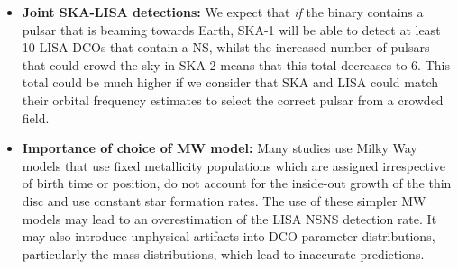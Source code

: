\begin{itemize}
    \item \textbf{Joint SKA-LISA detections:} We expect that \textit{if} the binary contains a pulsar that is beaming towards Earth, SKA-1 will be able to detect at least 10 LISA DCOs that contain a NS, whilst the increased number of pulsars that could crowd the sky in SKA-2 means that this total decreases to 6. This total could be much higher if we consider that SKA and LISA could match their orbital frequency estimates to select the correct pulsar from a crowded field.
    \item \textbf{Importance of choice of MW model:} Many studies use Milky Way models that use fixed metallicity populations which are assigned irrespective of birth time or position, do not account for the inside-out growth of the thin disc and use constant star formation rates. The use of these simpler MW models may lead to an overestimation of the LISA NSNS detection rate. It may also introduce unphysical artifacts into DCO parameter distributions, particularly the mass distributions, which lead to inaccurate predictions.
\end{itemize}